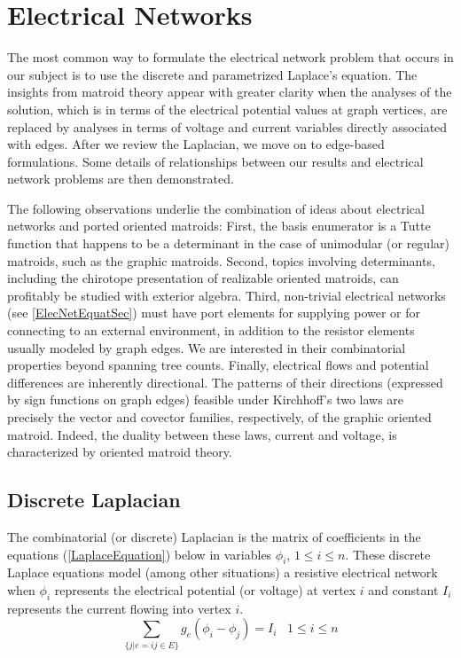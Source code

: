 \documentclass[12pt]{article}
\theoremstyle{definition}
\begin{document}
\section{Electrical Networks}
\label{ENets}
The most common way to formulate the electrical network problem 
that occurs in our subject is to use the discrete and parametrized
Laplace's equation.  The insights from matroid theory appear 
with greater clarity when the analyses of the solution, which is
in terms of the electrical potential values at graph vertices, are 
replaced by analyses in terms of voltage and current variables 
directly associated with edges.  After we review the Laplacian,
we move on to edge-based formulations.  Some details of relationships
between our results and electrical network problems are then demonstrated.

The following observations underlie the combination of ideas
about electrical networks and ported oriented matroids:
First, the basis enumerator is a Tutte function that 
happens to be a determinant in the case of unimodular 
(or regular) matroids, such as the graphic matroids.
Second, topics involving determinants, including the
chirotope presentation of realizable oriented matroids,
can profitably be studied with exterior algebra.  
Third,
non-trivial electrical networks (see \textsection \ref{ElecNetEquatSec}) 
must have port elements 
for supplying power or for connecting to an external environment,
in addition to the resistor elements usually modeled by
graph edges.  We are interested in their combinatorial 
properties beyond spanning tree 
counts\cite{sdcMTT,sdcBDIMatroid,sdcELEW,sdcPorted,sdcISCAS95,sdcOMP,sdcISCAS98}.
Finally, electrical flows and potential differences
are inherently directional.  The patterns of their directions
(expressed by sign functions on graph edges)
feasible under Kirchhoff's two laws are precisely the 
vector and covector families, respectively, of the graphic 
oriented matroid.  Indeed, the duality between these laws, current
and voltage, is characterized by oriented matroid theory.

\subsection{Discrete Laplacian}
\label{Laplacian}
The combinatorial (or discrete) Laplacian
is the matrix of coefficients
in the equations (\ref{LaplaceEquation}) 
below
in variables $\phi_i$, $1\leq i \leq n$.
These discrete Laplace equations model (among other 
situations) a resistive electrical network
when $\phi_i$ represents the electrical potential 
(or voltage) at vertex $i$ and
constant $I_i$ represents the current flowing into
vertex $i$.
\begin{equation}
\label{LaplaceEquation}
\sum_{\{j | e=ij\in E\}}
g_e(\phi_i-\phi_j) = I_i \;\;\; 1\le i \le n
\end{equation}
\end{document}
